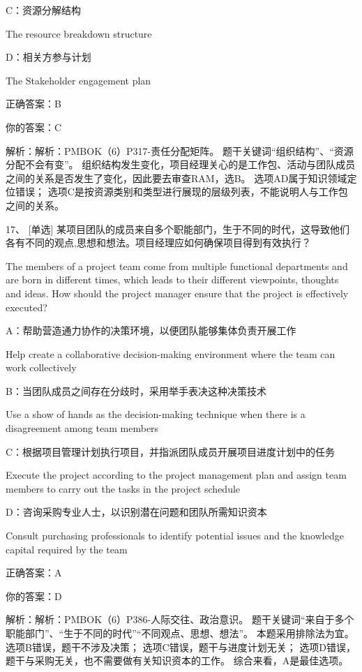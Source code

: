 C：资源分解结构

The resource breakdown structure

D：相关方参与计划

The Stakeholder engagement plan

正确答案：B

你的答案：C

解析：解析：PMBOK（6）P317-责任分配矩阵。 题干关键词“组织结构”、“资源分配不会有变”。 组织结构发生变化，项目经理关心的是工作包、活动与团队成员之间的关系是否发生了变化，因此要去审查RAM，选B。 选项AD属于知识领域定位错误； 选项C是按资源类别和类型进行展现的层级列表，不能说明人与工作包之间的关系。


17、 [单选] 某项目团队的成员来自多个职能部门，生于不同的时代，这导致他们各有不同的观点,思想和想法。项目经理应如何确保项目得到有效执行？

The members of a project team come from multiple functional departments and are born in different times, which leads to their different viewpoints, thoughts and ideas. How should the project manager ensure that the project is effectively executed?

A：帮助营造通力协作的决策环境，以便团队能够集体负责开展工作

Help create a collaborative decision-making environment where the team can work collectively

B：当团队成员之间存在分歧时，采用举手表决这种决策技术

Use a show of hands as the decision-making technique when there is a disagreement among team members

C：根据项目管理计划执行项目，并指派团队成员开展项目进度计划中的任务

Execute the project according to the project management plan and assign team members to carry out the tasks in the project schedule

D：咨询采购专业人士，以识别潜在问题和团队所需知识资本

Consult purchasing professionals to identify potential issues and the knowledge capital required by the team

正确答案：A

你的答案：D

解析：解析：PMBOK（6）P386-人际交往、政治意识。 题干关键词“来自于多个职能部门”、“生于不同的时代”“不同观点、思想、想法”。 本题采用排除法为宜。 选项B错误，题干不涉及决策； 选项C错误，题干与进度计划无关； 选项D错误，题干与采购无关，也不需要做有关知识资本的工作。 综合来看，A是最佳选项。

